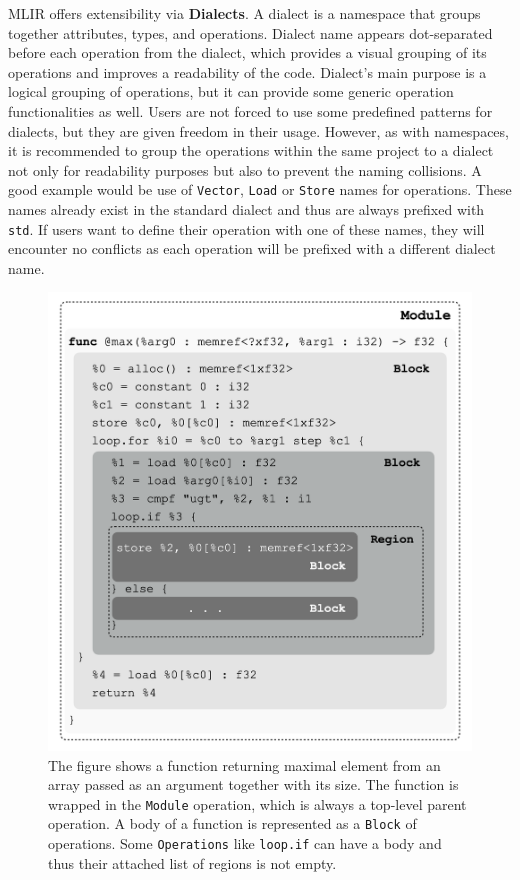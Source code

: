 \documentclass[sigplan,\review anonymous]{acmart}
\begin{document}
MLIR offers extensibility via \textbf{Dialects}. A dialect is a namespace that
groups together attributes, types, and operations. Dialect name appears
dot-separated before each operation from the dialect, which provides a visual
grouping of its operations and improves a readability of the code. Dialect's
main purpose is a logical grouping of operations, but it can provide some
generic operation functionalities as well. Users are not forced to use some
predefined patterns for dialects, but they are given freedom in their usage.
However, as with namespaces, it is recommended to group the operations within
the same project to a dialect not only for readability purposes but also to
prevent the naming collisions. A good example would be use of \texttt{Vector},
\texttt{Load} or \texttt{Store} names for operations. These names already exist
in the standard dialect and thus are always prefixed with \texttt{std}. If
users want to define their operation with one of these names, they will
encounter no conflicts as each operation will be prefixed with a different
dialect name.

\begin{figure}
  \centering
  \includegraphics[width=\columnwidth]{images/mlir_max.png}
  \caption{The figure shows a function returning maximal element from an array
  passed as an argument together with its size. The function is wrapped in the
  \texttt{Module} operation, which is always a top-level parent operation. A
  body of a function is represented as a \texttt{Block} of operations. Some
  \texttt{Operations} like \texttt{loop.if} can have a body and thus their
  attached list of regions is not empty.}
  \label{fig:mlir_max}
\end{figure}
\end{document}
